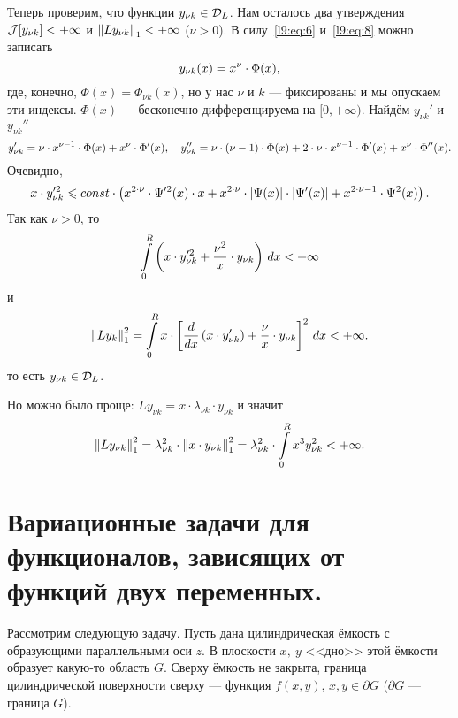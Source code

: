 Теперь проверим, что функции $y_{\nu k}\in\mathcal{D}_L$. Нам осталось два утверждения $\mathcal{J}[y_{\nu k}]<+\infty$ и $\left\|Ly_{\nu k}\right\|_1<+\infty$ ($\nu>0$). В силу~\eqref{l9:eq:6} и~\eqref{l9:eq:8} можно записать
\begin{equation*}
	\hfill y_{\nu k}(x)=x^{\nu}\cdot\Phi(x),\hfill 
\end{equation*}
где, конечно, $\Phi(x)=\Phi_{\nu k}(x)$, но у нас $\nu$ и $k$ --- фиксированы и мы опускаем эти индексы. $\Phi(x)$ --- бесконечно дифференцируема на $[0,+\infty)$. Найдём $y_{\nu k}'$ и $y_{\nu k}''$
\begin{equation*}
	\hfill y_{\nu k}'=\nu\cdot x^{\nu-1}\cdot\Phi(x)+x^{\nu}\cdot\Phi'(x),\quad y_{\nu k}''=\nu\cdot(\nu-1)\cdot\Phi(x)+2\cdot\nu\cdot x^{\nu-1}\cdot\Phi'(x)+x^{\nu}\cdot\Phi''(x).\hfill
\end{equation*}
Очевидно,
\begin{equation*}
	\hfill x\cdot y_{\nu k}^{\prime2}\leqslant const\cdot\left(x^{2\cdot\nu}\cdot\Psi^{\prime2}(x)\cdot x+x^{2\cdot\nu}\cdot|\Psi(x)|\cdot|\Psi'(x)|+x^{2\cdot\nu-1}\cdot\Psi^2(x)\right).\hfill
\end{equation*}
Так как $\nu>0$, то
\begin{equation*}
	\hfill\int\limits_0^R\left(x\cdot y_{\nu k}^{\prime2}+\frac{\nu^2}{x}\cdot y_{\nu k}\right)\,dx<+\infty\hfill
\end{equation*}
и 
\begin{equation*}
	\hfill\norm{Ly_k}_1^2=\int\limits_0^R x\cdot\left[\der{}{x}\left(x\cdot y_{\nu k}'\right)+\frac{\nu}{x}\cdot y_{\nu k}\right]^2\,dx<+\infty.\hfill
\end{equation*}
то есть $y_{\nu k}\in\mathcal{D}_L$. 

Но можно было проще: $Ly_{\nu k}=x\cdot\lambda_{\nu k}\cdot y_{\nu k}$ и значит
\begin{equation*}
	\hfill\norm{Ly_{\nu k}}_1^2=\lambda_{\nu k}^2\cdot\norm{x\cdot y_{\nu k}}_1^2=\lambda_{\nu k}^2\cdot\int\limits_0^R x^3 y_{\nu k}^2<+\infty.\hfill
\end{equation*} 
\section[Функционалы, зависящие от функций двух переменных.]{Вариационные задачи для функционалов, зависящих от функций двух переменных.}
\label{lecture9section2}
Рассмотрим следующую задачу. Пусть дана цилиндрическая ёмкость с образующими параллельными оси $z$. В плоскости $x,\ y$ <<дно>> этой ёмкости образует какую-то область $G$. Сверху ёмкость не закрыта, граница цилиндрической поверхности сверху --- функция $f(x,y)$, $x,y\in\partial G$ ($\partial G$ --- граница $G$).



